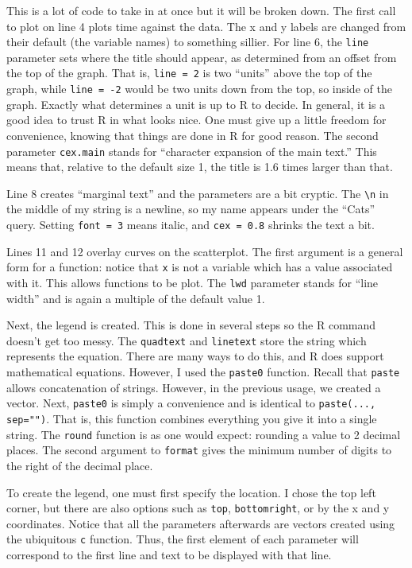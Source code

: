 \documentclass[12pt]{article}
\theoremstyle{remark}
\begin{document}
This is a lot of code to take in at once but it will be broken down. The first call to plot on line 4 plots time against the data. The x and y labels are changed from their default (the variable names) to something sillier. For line 6, the \verb|line| parameter sets where the title should appear, as determined from an offset from the top of the graph. That is, \verb|line = 2| is two ``units'' above the top of the graph, while \verb|line = -2| would be two units down from the top, so inside of the graph. Exactly what determines a unit is up to R to decide. In general, it is a good idea to trust R in what looks nice. One must give up a little freedom for convenience, knowing that things are done in R for good reason. The second parameter \verb|cex.main| stands for ``character expansion of the main text.'' This means that, relative to the default size 1, the title is 1.6 times larger than that.

Line 8 creates ``marginal text'' and the parameters are a bit cryptic. The \verb|\n| in the middle of my string is a newline, so my name appears under the ``Cats'' query. Setting \verb|font = 3| means italic, and \verb|cex = 0.8| shrinks the text a bit. 

Lines 11 and 12 overlay curves on the scatterplot. The first argument is a general form for a function: notice that \verb|x| is not a variable which has a value associated with it. This allows functions to be plot. The \verb|lwd| parameter stands for ``line width'' and is again a multiple of the default value 1.

Next, the legend is created. This is done in several steps so the R command doesn't get too messy. The \verb|quadtext| and \verb|linetext| store the string which represents the equation. There are many ways to do this, and R does support mathematical equations. However, I used the \verb|paste0| function. Recall that \verb|paste| allows concatenation of strings. However, in the previous usage, we created a vector. Next, \verb|paste0| is simply a convenience and is identical to \verb|paste(..., sep="")|. That is, this function combines everything you give it into a single string. The \verb|round| function is as one would expect: rounding a value to 2 decimal places. The second argument to \verb|format| gives the minimum number of digits to the right of the decimal place.

To create the legend, one must first specify the location. I chose the top left corner, but there are also options such as \verb|top|, \verb|bottomright|, or by the x and y coordinates. Notice that all the parameters afterwards are vectors created using the ubiquitous \verb|c| function. Thus, the first element of each parameter will correspond to the first line and text to be displayed with that line.
\end{document}
